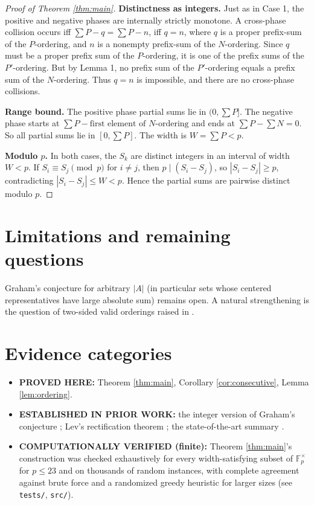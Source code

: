 \documentclass[11pt]{article}
\theoremstyle{definition}
\begin{document}
\begin{proof}[Proof of Theorem \ref{thm:main}]
\textbf{Distinctness as integers.} Just as in Case 1, the positive and
negative phases are internally strictly monotone. A cross-phase collision
occurs iff $\sum P - q = \sum P - n$, iff $q=n$, where $q$ is a proper
prefix-sum of the $P\text{-ordering}$, and $n$ is a nonempty prefix-sum of
the $N\text{-ordering}$. Since $q$ must be a proper prefix sum of the
$P\text{-ordering}$, it is one of the prefix sums of the
$P'\text{-ordering}$. But by Lemma 1, no prefix sum of the
$P'\text{-ordering}$ equals a prefix sum of the $N\text{-ordering}$. Thus
$q=n$ is impossible, and there are no cross-phase collisions.

\textbf{Range bound.} The positive phase partial sums lie in $(0, \sum P]$.
The negative phase starts at $\sum P - \text{first element of } N\text{-ordering}$
and ends at $\sum P - \sum N = 0$. So all partial sums lie in $[0, \sum P]$.
The width is $W = \sum P < p$.

\textbf{Modulo $p$.} In both cases, the $S_k$ are distinct integers in an
interval of width $W<p$. If $S_i\equiv S_j\pmod p$ for $i\ne j$, then
$p\mid(S_i-S_j)$, so $|S_i-S_j|\ge p$, contradicting $|S_i-S_j|\le W<p$.
Hence the partial sums are pairwise distinct modulo $p$.
\end{proof}

\section{Limitations and remaining questions}

Graham's conjecture for arbitrary $|A|$ (in particular sets whose centered
representatives have large absolute sum) remains open. A natural strengthening
is the question of two-sided valid orderings raised in \cite{kravitz2024}.

\section{Evidence categories}

\begin{itemize}
\item \textbf{PROVED HERE:} Theorem \ref{thm:main}, Corollary
\ref{cor:consecutive}, Lemma \ref{lem:ordering}.
\item \textbf{ESTABLISHED IN PRIOR WORK:} the integer version of Graham's
conjecture \cite{kravitz2024,sawin2015}; Lev's rectification theorem
\cite{lev2008}; the state-of-the-art summary \cite{kravitz2024}.
\item \textbf{COMPUTATIONALLY VERIFIED (finite):} Theorem \ref{thm:main}'s
construction was checked exhaustively for every width-satisfying subset of
$\mathbb F_p^\times$ for $p\le 23$ and on thousands of random instances, with
complete agreement against brute force and a randomized greedy heuristic for larger sizes
(see \texttt{tests/}, \texttt{src/}).
\end{itemize}
\end{document}
